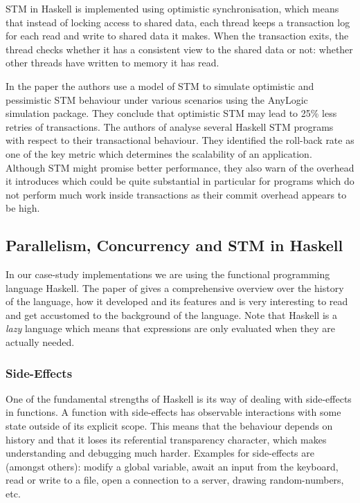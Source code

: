STM in Haskell is implemented using optimistic synchronisation, which means that instead of locking access to shared data, each thread keeps a transaction log for each read and write to shared data it makes. When the transaction exits, the thread checks whether it has a consistent view to the shared data or not: whether other threads have written to memory it has read. %

In the paper \cite{heindl_modeling_2009} the authors use a model of STM to simulate optimistic and pessimistic STM behaviour under various scenarios using the AnyLogic simulation package. They conclude that optimistic STM may lead to 25\% less retries of transactions. The authors of \cite{perfumo_limits_2008} analyse several Haskell STM programs with respect to their transactional behaviour. They identified the roll-back rate as one of the key metric which determines the scalability of an application. Although STM might promise better performance, they also warn of the overhead it introduces which could be quite substantial in particular for programs which do not perform much work inside transactions as their commit overhead appears to be high.

\subsection{Parallelism, Concurrency and STM in Haskell}
In our case-study implementations we are using the functional programming language Haskell. The paper of \citep{hudak_history_2007} gives a comprehensive overview over the history of the language, how it developed and its features and is very interesting to read and get accustomed to the background of the language. Note that Haskell is a \textit{lazy} language which means that expressions are only evaluated when they are actually needed.

\subsubsection{Side-Effects}
One of the fundamental strengths of Haskell is its way of dealing with side-effects in functions. A function with side-effects has observable interactions with some state outside of its explicit scope. This means that the behaviour depends on history and that it loses its referential transparency character, which makes understanding and debugging much harder. Examples for side-effects are (amongst others): modify a global variable, await an input from the keyboard, read or write to a file, open a connection to a server, drawing random-numbers, etc.

